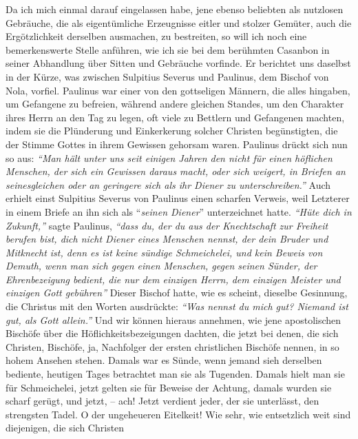Da ich mich einmal darauf eingelassen habe, jene ebenso beliebten als nutzlosen
Gebräuche, die als eigentümliche Erzeugnisse eitler und stolzer Gemüter, auch
die Ergötzlichkeit derselben ausmachen, zu bestreiten, so will ich noch eine
bemerkenswerte Stelle anführen, wie ich sie bei dem berühmten
Casanbon in
seiner Abhandlung über Sitten und Gebräuche vorfinde. Er berichtet uns daselbst
in der Kürze, was zwischen Sulpitius Severus
und Paulinus,
dem Bischof von
Nola, vorfiel. Paulinus war einer von den gottseligen Männern, die alles
hingaben, um Gefangene zu befreien, während andere gleichen Standes, um den
Charakter ihres Herrn an den Tag zu legen, oft viele zu Bettlern und Gefangenen
machten, indem sie die Plünderung und Einkerkerung solcher Christen
begünstigten, die der Stimme Gottes in ihrem Gewissen gehorsam waren. Paulinus
drückt sich nun so aus: \textit{"`Man hält unter uns seit einigen Jahren den
nicht für
einen höflichen Menschen, der sich ein Gewissen daraus macht, oder sich weigert,
in Briefen an seinesgleichen oder an geringere sich als ihr Diener zu
unterschreiben."'} Auch erhielt einst Sulpitius Severus von Paulinus einen
scharfen Verweis, weil Letzterer in einem Briefe an ihn sich
als "`\textit{seinen Diener}"'
unterzeichnet hatte. \textit{"`Hüte dich in Zukunft,"'} sagte Paulinus,
\textit{"`dass du, der du
aus der Knechtschaft zur Freiheit berufen bist, dich nicht Diener eines Menschen
nennst, der dein Bruder und Mitknecht ist, denn es ist keine sündige
Schmeichelei, und kein Beweis von Demuth, wenn man sich gegen einen Menschen,
gegen seinen Sünder, der Ehrenbezeigung bedient, die nur dem einzigen Herrn, dem
einzigen Meister und einzigen Gott gebühren"'} Dieser Bischof hatte, wie es
scheint, dieselbe Gesinnung, die Christus mit den Worten ausdrückte:
\textit{"`Was
nennst du mich gut? Niemand ist gut, als Gott allein."'} Und wir können hieraus
annehmen, wie jene apostolischen Bischöfe über die Höflichkeitsbezeigungen
dachten, die jetzt bei denen, die sich Christen, Bischöfe, ja, Nachfolger der
ersten christlichen Bischöfe nennen, in so hohem Ansehen stehen. Damals war es
Sünde, wenn jemand sieh derselben bediente, heutigen Tages betrachtet man sie
als Tugenden. Damals hielt man sie für Schmeichelei, jetzt gelten sie für
Beweise der Achtung, damals wurden sie scharf gerügt, und jetzt, -- ach! Jetzt
verdient jeder, der sie unterlässt, den strengsten Tadel. O der ungeheueren
Eitelkeit! Wie sehr, wie entsetzlich weit sind diejenigen, die sich Christen
